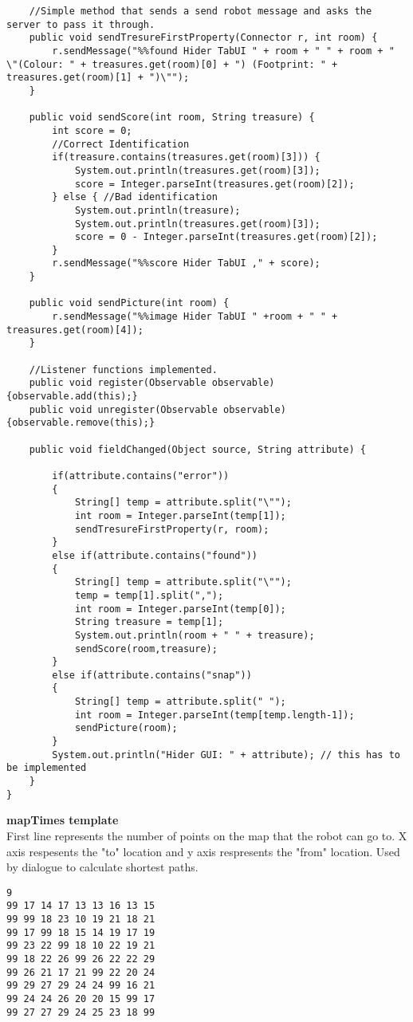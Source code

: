 \begin{lstlisting}
	//Simple method that sends a send robot message and asks the server to pass it through.
	public void sendTresureFirstProperty(Connector r, int room) {
		r.sendMessage("%%found Hider TabUI " + room + " " + room + " \"(Colour: " + treasures.get(room)[0] + ") (Footprint: " + treasures.get(room)[1] + ")\"");
	}

	public void sendScore(int room, String treasure) {
		int score = 0;
		//Correct Identification
		if(treasure.contains(treasures.get(room)[3])) {
			System.out.println(treasures.get(room)[3]);
			score = Integer.parseInt(treasures.get(room)[2]);
		} else { //Bad identification
			System.out.println(treasure);
			System.out.println(treasures.get(room)[3]);
			score = 0 - Integer.parseInt(treasures.get(room)[2]);
		}
		r.sendMessage("%%score Hider TabUI ," + score);
	}

	public void sendPicture(int room) {
		r.sendMessage("%%image Hider TabUI " +room + " " + treasures.get(room)[4]);
	}

	//Listener functions implemented.
	public void register(Observable observable) {observable.add(this);}
  	public void unregister(Observable observable) {observable.remove(this);}

  	public void fieldChanged(Object source, String attribute) {

  		if(attribute.contains("error")) 
  		{
  			String[] temp = attribute.split("\"");
  			int room = Integer.parseInt(temp[1]);
  			sendTresureFirstProperty(r, room);
  		} 
  		else if(attribute.contains("found")) 
  		{
  			String[] temp = attribute.split("\"");
  			temp = temp[1].split(",");
  			int room = Integer.parseInt(temp[0]);
  			String treasure = temp[1];
  			System.out.println(room + " " + treasure);
  			sendScore(room,treasure);
  		} 
  		else if(attribute.contains("snap")) 
  		{
  			String[] temp = attribute.split(" ");
  			int room = Integer.parseInt(temp[temp.length-1]);
  			sendPicture(room);
  		}
    	System.out.println("Hider GUI: " + attribute); // this has to be implemented
  	}
}
\end{lstlisting}
\textbf{mapTimes template} \\
First line represents the number of points on the map that the robot can go to. X axis respesents the "to" location and y axis respresents the "from" location. Used by dialogue to calculate shortest paths.
\begin{lstlisting}
9
99 17 14 17 13 13 16 13 15
99 99 18 23 10 19 21 18 21
99 17 99 18 15 14 19 17 19
99 23 22 99 18 10 22 19 21
99 18 22 26 99 26 22 22 29
99 26 21 17 21 99 22 20 24
99 29 27 29 24 24 99 16 21
99 24 24 26 20 20 15 99 17
99 27 27 29 24 25 23 18 99
\end{lstlisting}
